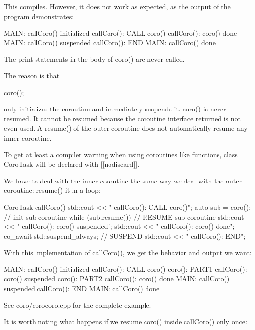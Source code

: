 This compiles. However, it does not work as expected, as the output of the program demonstrates:

\begin{shell}
MAIN: callCoro() initialized
  callCoro(): CALL coro()
  callCoro(): coro() done
MAIN: callCoro() suspended
  callCoro(): END
MAIN: callCoro() done
\end{shell}

The print statements in the body of coro() are never called.

The reason is that

\begin{cpp}
coro();
\end{cpp}

only initializes the coroutine and immediately suspends it. coro() is never resumed. It cannot be resumed because the coroutine interface returned is not even used. A resume() of the outer coroutine does not automatically resume any inner coroutine.

To get at least a compiler warning when using coroutines like functions, class CoroTask will be declared with [[nodiscard]].


We have to deal with the inner coroutine the same way we deal with the outer coroutine: resume() it in a loop:

\begin{cpp}
CoroTask callCoro()
{
	std::cout << " callCoro(): CALL coro()\n";
	auto sub = coro(); // init sub-coroutine
	while (sub.resume()) { // RESUME sub-coroutine
		std::cout << " callCoro(): coro() suspended\n";
	}
	std::cout << " callCoro(): coro() done\n";
	co_await std::suspend_always{}; // SUSPEND
	std::cout << " callCoro(): END\n";
}
\end{cpp}

With this implementation of callCoro(), we get the behavior and output we want:

\begin{shell}
MAIN: callCoro() initialized
  callCoro(): CALL coro()
    coro(): PART1
  callCoro(): coro() suspended
    coro(): PART2
  callCoro(): coro() done
MAIN: callCoro() suspended
  callCoro(): END
MAIN: callCoro() done
\end{shell}

See coro/corocoro.cpp for the complete example.


It is worth noting what happens if we resume coro() inside callCoro() only once:


